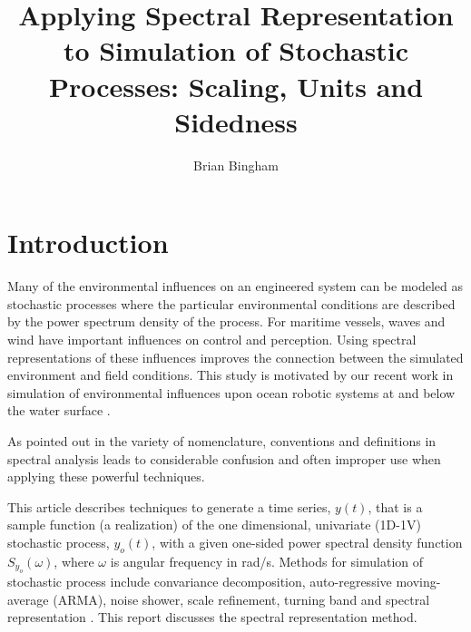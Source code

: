 \documentclass[techreport, article]{npsreport2018}
\title{Applying Spectral Representation to Simulation of Stochastic Processes: Scaling, Units and Sidedness}
\author{Brian Bingham}
\begin{document}
\NPScover                  %
\NPSsftne                  %
\NPSsignature             %
\NPSabstractpage           %
\newcommand{\SF}{0.7}
\newcommand{\SFb}{0.45}
\newcommand{\SFPic}{0.45}
\newcommand{\SFPlot}{0.45}
\newcommand{\SFc}{0.52}
\newcommand{\FigWidth}{\SF}


%
%

\NPSbody

\section{Introduction}
Many of the environmental influences on an engineered system can be modeled as stochastic processes where the particular environmental conditions are described by the power spectrum density of the process.  For maritime vessels, waves and wind have important influences on control and perception.  Using spectral representations of these influences improves the connection between the simulated environment and field conditions.  This study is motivated by our recent work in simulation of environmental influences upon ocean robotic systems at and below the water surface \cite{bingham2019maritime, zhang22dave, choi22fasterrohtua}.

As pointed out in \cite{barbour15normalization} the variety of nomenclature, conventions and definitions in spectral analysis leads to considerable confusion and often improper use when applying these powerful techniques.

This article describes techniques to generate a time series, $y(t)$, that is a sample function (a realization) of the one dimensional, univariate (1D-1V) stochastic process, $y_o(t)$, with a given one-sided power spectral density function $S_{y_{o}}(\omega)$, where $\omega$ is angular frequency in \unit[]{rad/s}.  %
Methods for simulation of stochastic process include convariance decomposition, auto-regressive moving-average (ARMA), noise shower, scale refinement, turning band and spectral representation \cite{cao00simulation}.  This report discusses the spectral representation method.
\end{document}
